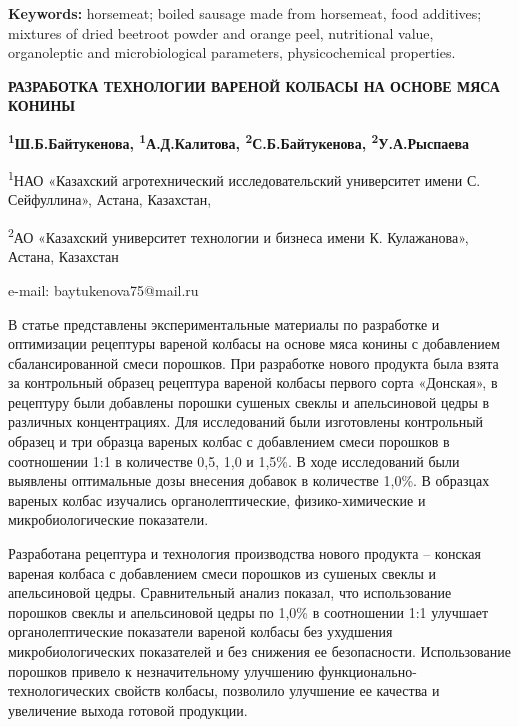 {\bfseries Keywords:} horsemeat; boiled sausage made from horsemeat, food
additives; mixtures of dried beetroot powder and orange peel,
nutritional value, organoleptic and microbiological parameters,
physicochemical properties.

\begin{articleheader}
{\bfseries РАЗРАБОТКА ТЕХНОЛОГИИ ВАРЕНОЙ КОЛБАСЫ НА ОСНОВЕ МЯСА КОНИНЫ}

{\bfseries
\textsuperscript{1}Ш.Б.Байтукенова\textsuperscript{\envelope },
\textsuperscript{1}А.Д.Калитова,
\textsuperscript{2}С.Б.Байтукенова,
\textsuperscript{2}У.А.Рыспаева
}
\end{articleheader}

\begin{affiliation}
\textsuperscript{1}НАО «Казахский агротехнический исследовательский
университет имени С. Сейфуллина», Астана, Казахстан,

\textsuperscript{2}АО «Казахский университет технологии и бизнеса имени
К. Кулажанова», Астана, Казахстан

e-mail: baytukenova75@mail.ru
\end{affiliation}

В статье представлены экспериментальные материалы по разработке и
оптимизации рецептуры вареной колбасы на основе мяса конины с
добавлением сбалансированной смеси порошков. При разработке нового
продукта была взята за контрольный образец рецептура вареной колбасы
первого сорта «Донская», в рецептуру были добавлены порошки сушеных
свеклы и апельсиновой цедры в различных концентрациях. Для исследований
были изготовлены контрольный образец и три образца вареных колбас с
добавлением смеси порошков в соотношении 1:1 в количестве 0,5, 1,0 и
1,5\%. В ходе исследований были выявлены оптимальные дозы внесения
добавок в количестве 1,0\%. В образцах вареных колбас изучались
органолептические, физико-химические и микробиологические показатели.

Разработана рецептура и технология производства нового продукта --
конская вареная колбаса с добавлением смеси порошков из сушеных свеклы и
апельсиновой цедры. Сравнительный анализ показал, что использование
порошков свеклы и апельсиновой цедры по 1,0\% в соотношении 1:1 улучшает
органолептические показатели вареной колбасы без ухудшения
микробиологических показателей и без снижения ее безопасности.
Использование порошков привело к незначительному улучшению
функционально-технологических свойств колбасы, позволило улучшение ее
качества и увеличение выхода готовой продукции.

